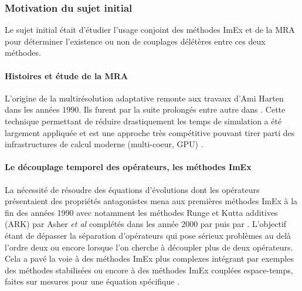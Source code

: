     \subsubsection{Motivation du sujet initial}
    Le sujet initial était d'étudier l'usage conjoint des méthodes ImEx et de la MRA pour déterminer l'existence ou non de couplages délétères entre ces deux méthodes.\par 

    \paragraph{Histoires et étude de la MRA}
    L'origine de la multirésolution adaptative remonte aux travaux d'Ami Harten \cite{harten1994} dans les années 1990. Ils furent par la suite prolongés entre autre dans \cite{Kaibara2001,Cohen2003}.
    Cette technique permettant de réduire drastiquement les temps de simulation a été largement appliquée et est une approche très compétitive \cite{compare_MRA_AMR} pouvant tirer parti des infrastructures de calcul moderne (multi-coeur, GPU) \cite{GPU_bench}.

    \paragraph{Le découplage temporel des opérateurs, les méthodes ImEx}
    La nécessité de résoudre des équations d'évolutions dont les opérateurs présentaient des propriétés antagonistes mena aux premières méthodes ImEx à la fin des années 1990 
    avec notamment les méthodes Runge et Kutta additives (ARK) par Asher \textit{et al} \cite{ASCHER1997151} complétés dans les année 2000 par \cite{KENNEDY2003139} puis par \cite{FITZHUGH1961445}. 
    L'objectif étant de dépasser la séparation d'opérateurs \cite{Strang1968} qui pose sérieux problèmes au delà l'ordre deux ou encore lorsque l'on cherche à découpler plus de deux opérateurs.
    Cela a pavé la voie à des méthodes ImEx plus complexes intégrant par exemples des méthodes stabilisées \cite{Abdulle2013} 
    ou encore à des méthodes ImEx couplées espace-temps, faites sur mesures pour une équation spécifique \cite{rebou2024}.

